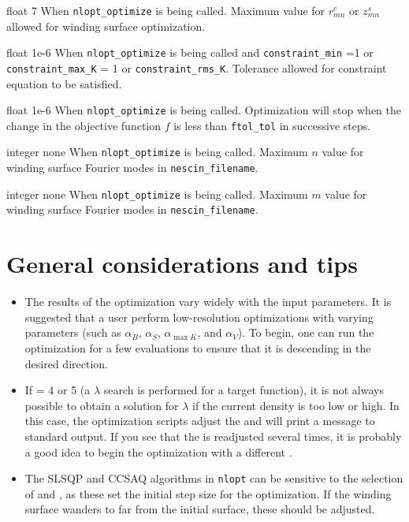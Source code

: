 \myhrule

{float}
{7}
{When \texttt{nlopt\_optimize} is being called. }
{Maximum value for $r_{mn}^c$ or $z_{mn}^s$ allowed for winding surface optimization.}

\myhrule

{float}
{1e-6}
{When \texttt{nlopt\_optimize} is being called and \texttt{constraint\_min} =1 or \texttt{constraint\_max\_K} = 1 or \texttt{constraint\_rms\_K}.}
{Tolerance allowed for constraint equation to be satisfied.}

\myhrule

{float}
{1e-6}
{When \texttt{nlopt\_optimize} is being called.}
{Optimization will stop when the change in the objective function $f$ is less than \texttt{ftol\_tol} in successive steps.}

\myhrule

{integer}
{none}
{When \texttt{nlopt\_optimize} is being called.}
{Maximum $n$ value for winding surface Fourier modes in \texttt{nescin\_filename}.}

\myhrule

{integer}
{none}
{When \texttt{nlopt\_optimize} is being called.}
{Maximum $m$ value for winding surface Fourier modes in \texttt{nescin\_filename}.}

\section{General considerations and tips}
\begin{itemize}
\item The results of the optimization vary widely with the input parameters. It is suggested that a user perform low-resolution optimizations with varying parameters (such as $\alpha_B$, $\alpha_S$, $\alpha_{\max{K}}$, and $\alpha_V$). To begin, one can run the optimization for a few evaluations to ensure that it is descending in the desired direction. 
\item If  = 4 or 5 (a $\lambda$ search is performed for a target function), it is not always possible to obtain a solution for $\lambda$ if the current density is too low or high. In this case, the optimization scripts adjust the  and will print a message to standard output. If you see that the  is readjusted several times, it is probably a good idea to begin the optimization with a different  . 
\item The SLSQP and CCSAQ algorithms in \texttt{nlopt} can be sensitive to the selection of  and , as these set the initial step size for the optimization. If the winding surface wanders to far from the initial surface, these should be adjusted. 
\end{itemize}



